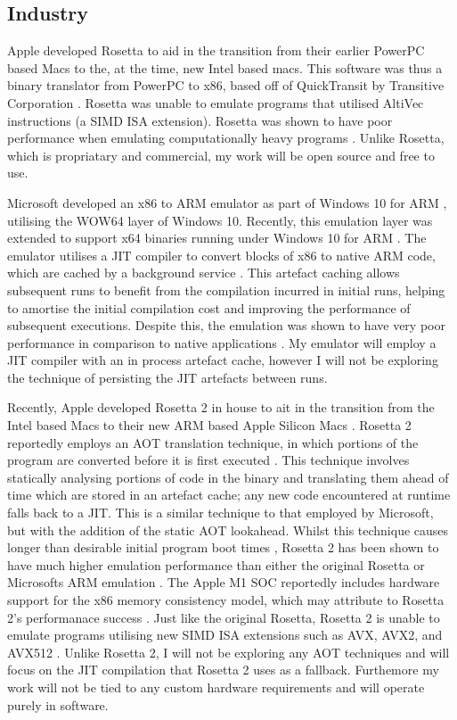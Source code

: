 \subsection{Industry}

Apple developed Rosetta \cite{apple-rosetta} to aid in the transition from their earlier PowerPC based Macs to the, at the time, new Intel based macs. This software was thus a binary translator from PowerPC to x86, based off of QuickTransit by Transitive Corporation \cite{cnet-rosetta}. Rosetta was unable to emulate programs that utilised AltiVec instructions (a SIMD ISA extension). Rosetta was shown to have poor performance when emulating computationally heavy programs \cite{rosetta-perf}. Unlike Rosetta, which is propriatary and commercial, my work will be open source and free to use.

Microsoft developed an x86 to ARM emulator as part of Windows 10 for ARM \cite{docs-win10-arm-emu}, utilising the WOW64 \cite{WOW64} layer of Windows 10. Recently, this emulation layer was extended to support x64 binaries running under Windows 10 for ARM \cite{win10-arm-x64-emu}. The emulator utilises a JIT compiler to convert blocks of x86 to native ARM code, which are cached by a background service \cite{docs-win10-arm-emu, blackberry-win10-arm-emu}. This artefact caching allows subsequent runs to benefit from the compilation incurred in initial runs, helping to amortise the initial compilation cost and improving the performance of subsequent executions. Despite this, the emulation was shown to have very poor performance in comparison to native applications \cite{win10-arm-x64-emu-perf1, win10-arm-x64-emu-perf2}. My emulator will employ a JIT compiler with an in process artefact cache, however I will not be exploring the technique of persisting the JIT artefacts between runs.

Recently, Apple developed Rosetta 2 \cite{rosetta2} in house to ait in the transition from the Intel based Macs to their new ARM based Apple Silicon Macs \cite{rosetta2, apple-silicon}. Rosetta 2 reportedly employs an AOT translation technique, in which portions of the program are converted before it is first executed \cite{rosetta2-aot, ars-technica-big-sur}. This technique involves statically analysing portions of code in the binary and translating them ahead of time which are stored in an artefact cache; any new code encountered at runtime falls back to a JIT. This is a similar technique to that employed by Microsoft, but with the addition of the static AOT lookahead. Whilst this technique causes longer than desirable initial program boot times \cite{rosetta2-slow-launch}, Rosetta 2 has been shown to have much higher emulation performance than either the original Rosetta or Microsofts ARM emulation \cite{rosetta2-perf}. The Apple M1 SOC reportedly includes hardware support for the x86 memory consistency model, which may attribute to Rosetta 2's performanace success \cite{rosetta2-infoq}. Just like the original Rosetta, Rosetta 2 is unable to emulate programs utilising new SIMD ISA extensions such as AVX, AVX2, and AVX512 \cite{rosetta2}. Unlike Rosetta 2, I will not be exploring any AOT techniques and will focus on the JIT compilation that Rosetta 2 uses as a fallback. Furthemore my work will not be tied to any custom hardware requirements and will operate purely in software.
